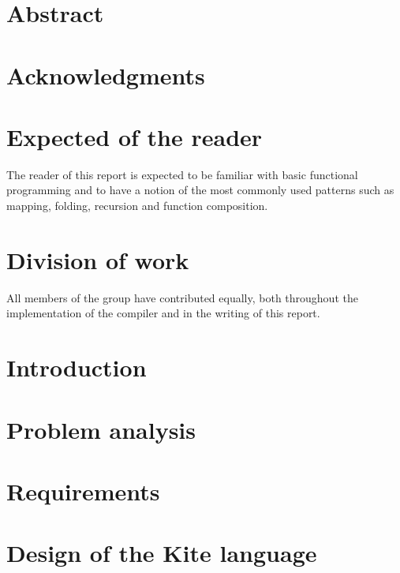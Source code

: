 \documentclass{article}
\begin{document}

\clearpage

\section*{Abstract}
\label{sec:abstract}

\clearpage

\section*{Acknowledgments}
\label{sec:acknow}


\section*{Expected of the reader}
The reader of this report is expected to be familiar with basic functional programming and to have a notion of the most commonly used patterns such as mapping, folding, recursion and function composition.

\section*{Division of work}
All members of the group have contributed equally, both throughout the implementation of the compiler and in the writing of this report.
\clearpage

\tableofcontents
\clearpage

\section{Introduction}
\label{sec:intro}

\clearpage

\section{Problem analysis}
\label{sec:probanal}

\clearpage

\section{Requirements}
\label{sec:requirements}

\clearpage

\section{Design of the Kite language}
\label{sec:kite-design}

\clearpage
\end{document}
